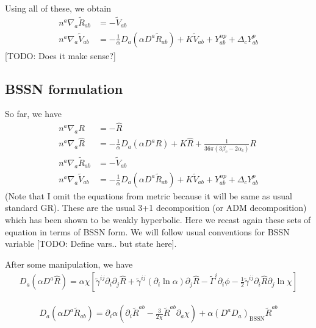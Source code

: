 \documentclass[a4paper,oneside,openany,11pt]{memoir}
\numberwithin{equation}{section} %
\newcommand{\TODO}[1]{{\color{red}[}{\color{red}TODO:} {\color{blue}#1}{\color{red}]}}
\begin{document}
Using all of these, we obtain
\begin{align}
n^a \nabla_a \tilde{R}_{ab} &= - \tilde{V}_{ab}  \\
n^a \nabla_a \tilde{V}_{ab} &= -  \frac{1}{\alpha} D_a (\alpha D^a \tilde{R}_{ab} ) + K \tilde{V}_{ab} + Y^{np}_{ab} + \Delta_c Y^{p}_{ab}
\end{align} 
\TODO{Does it make sense?}

\subsection{BSSN formulation}
So far, we have
\begin{align}
n^a \nabla_a R &= - \hat{R}  \\
n^a \nabla_a \hat{R} &= -  \frac{1}{\alpha} D_a (\alpha D^a R) + K \hat{R} + \frac{1}{36 \pi (3\beta_c - 2 \alpha_c)} R\\
n^a \nabla_a \tilde{R}_{ab} &= - \tilde{V}_{ab}  \\
n^a \nabla_a \tilde{V}_{ab} &= -  \frac{1}{\alpha} D_a (\alpha D^a \tilde{R}_{ab} ) + K \tilde{V}_{ab} + Y^{np}_{ab} + \Delta_c Y^{p}_{ab}
\end{align}
(Note that I omit the equations from metric because it will be same as usual standard GR). 
These are the usual 3+1 decomposition (or ADM decomposition) which has been shown to 
be weakly hyperbolic. Here we recast again these sets of equation in terms of BSSN form.
We will follow usual conventions for BSSN variable \TODO{Define vars.. but state here}.

After some manipulation, we have
\begin{align}
\label{eqn:bssn:inter1}
D_a ( \alpha D^a \hat{R}) = \alpha \chi \left[\tilde{\gamma}^{ij} \partial_i \partial_j \hat{R} + \tilde{\gamma}^{ij} (\partial_i  \ln \alpha) \partial_j \hat{R} - \tilde{\Gamma}^i \partial_i \phi - \frac{1}{2} \tilde{\gamma}^{ij} \partial_i \hat{R} \partial_j \ln \chi \right]
\end{align}

\begin{align}
\label{eqn:bssn:inter1}
D_a ( \alpha D^a \tilde{R}_{ab}) = \partial_i \alpha \left(\partial_i \tilde{R}^{ab} - \frac{3}{2\chi} \tilde{R}^{ab} \partial_a \chi \right) + \alpha (D^a D_a )_{\textrm{BSSN}} \tilde{R}^{ab}
\end{align}
\end{document}

